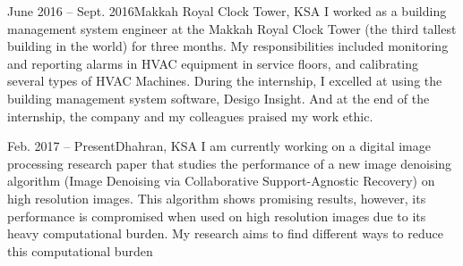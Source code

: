 \documentclass[10pt,a4paper]{altacv}
\begin{document}


\begin{fullwidth}
\makecvheader
\end{fullwidth}


{June 2016 -- Sept. 2016}{Makkah Royal Clock Tower, KSA}
I worked as a building management system engineer at the Makkah Royal Clock Tower (the third tallest building in the world) for three months. My responsibilities included monitoring and reporting alarms in HVAC equipment in service floors, and calibrating several types of HVAC Machines. During the internship, I excelled at using the building management system software, Desigo Insight. And at the end of the internship, the company and my colleagues praised my work ethic.





{Feb. 2017 -- Present}{Dhahran, KSA}
 I am currently working on a digital image processing research paper that studies the performance of a new image denoising algorithm (Image Denoising via Collaborative Support-Agnostic Recovery) on high resolution images. This algorithm shows promising results, however, its performance is  compromised when used on high resolution images due to its heavy computational burden. My research aims to find different ways to reduce this computational burden
\end{document}

